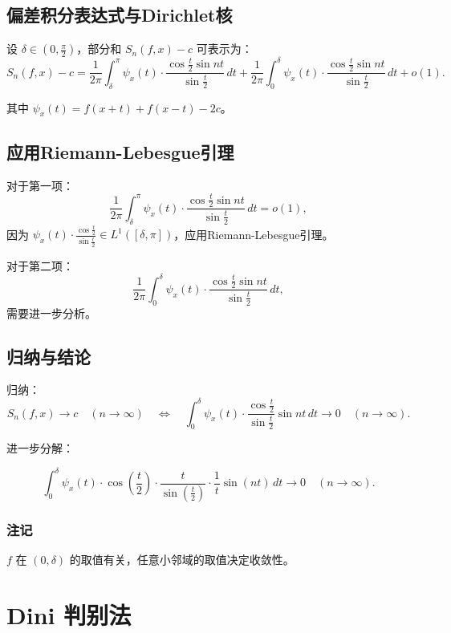\documentclass[12pt]{article}
\begin{document}
	
	\subsection{偏差积分表达式与Dirichlet核}
	
	设 \(\delta \in (0, \frac{\pi}{2})\)，部分和 \(S_n(f, x) - c\) 可表示为：
	\[
	S_n(f, x) - c = \frac{1}{2\pi} \int_\delta^\pi \psi_x(t) \cdot \frac{\cos \frac{t}{2} \sin nt}{\sin \frac{t}{2}} \, dt + \frac{1}{2\pi} \int_0^\delta \psi_x(t) \cdot \frac{\cos \frac{t}{2} \sin nt}{\sin \frac{t}{2}} \, dt + o(1).
	\]
	
	其中 \(\psi_x(t) = f(x+t) + f(x-t) - 2c\)。
	
	\subsection{应用Riemann-Lebesgue引理}
	
	对于第一项：
	\[
	\frac{1}{2\pi} \int_\delta^\pi \psi_x(t) \cdot \frac{\cos \frac{t}{2} \sin nt}{\sin \frac{t}{2}} \, dt = o(1),
	\]
	因为 \(\psi_x(t) \cdot \frac{\cos \frac{t}{2}}{\sin \frac{t}{2}} \in L^1([\delta, \pi])\)，应用Riemann-Lebesgue引理。
	

	对于第二项：
	\[
	\frac{1}{2\pi} \int_0^\delta \psi_x(t) \cdot \frac{\cos \frac{t}{2} \sin nt}{\sin \frac{t}{2}} \, dt,
	\]
	需要进一步分析。
	
	\subsection{归纳与结论}
	
	归纳：
	\[
	S_n(f, x) \to c \quad (n \to \infty) \quad \Leftrightarrow \quad \int_0^\delta \psi_x(t) \cdot \frac{\cos \frac{t}{2}}{\sin \frac{t}{2}} \sin nt \, dt \to 0 \quad (n \to \infty).
	\]
	
	进一步分解：

	\[
	\int_0^\delta \psi_x(t) \cdot \cos\left( \frac{t}{2} \right) \cdot \frac{t}{\sin\left( \frac{t}{2} \right)} \cdot \frac{1}{t} \sin(nt) \, dt \to 0 \quad (n \to \infty).
	\]
	

	\subsubsection{注记}
	
	\(f\) 在 \((0, \delta)\) 的取值有关，任意小邻域的取值决定收敛性。
	
	\section{Dini 判别法}
\end{document}
